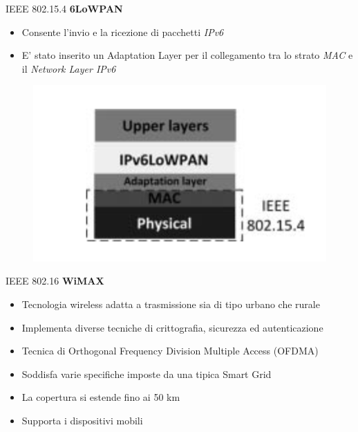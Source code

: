 \begin{frame}{IEEE 802.15.4}
	\textbf{6LoWPAN}
	\begin{itemize}
		\item Consente l'invio e la ricezione di pacchetti \textit{IPv6}
		\item E' stato inserito un Adaptation Layer per il collegamento tra lo strato \textit{MAC} e il \textit{Network Layer IPv6}
	\end{itemize}
	\begin{figure}[h]
		\includegraphics[scale=0.3,cfbox=blue_slides 1pt 0pt]{imgs/6pan.png}
	\end{figure}
\end{frame}

\begin{frame}{IEEE 802.16}
	\textbf{WiMAX}
	\begin{itemize}[<+- | alert@+>]
		\item Tecnologia wireless adatta a trasmissione sia di tipo urbano che rurale
		\item Implementa diverse tecniche di crittografia, sicurezza ed autenticazione
		\item Tecnica di Orthogonal Frequency Division Multiple Access (OFDMA)
		\item Soddisfa varie specifiche imposte da una tipica Smart Grid
		\item La copertura si estende fino ai 50 km
		\item Supporta i dispositivi mobili
	\end{itemize}
\end{frame}


